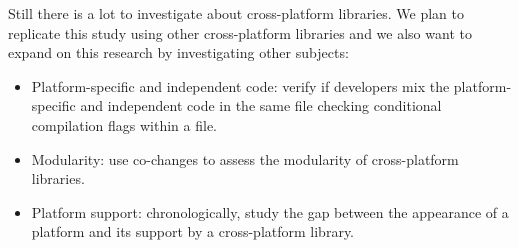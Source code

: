 \documentclass[10pt, conference]{IEEEtran}
\begin{document}
Still there is a lot to investigate about cross-platform libraries. We plan to replicate this study using other cross-platform libraries and we also want to expand on this research by investigating other subjects:
\begin{itemize}
 
\item Platform-specific and independent code: verify if developers mix the platform-specific and independent code in the same file checking conditional compilation flags within a file.

\item Modularity: use co-changes to assess the modularity of cross-platform libraries. 

\item Platform support: chronologically, study the gap between the appearance of a platform and its support by a cross-platform library.

\end{itemize}











\end{document}
